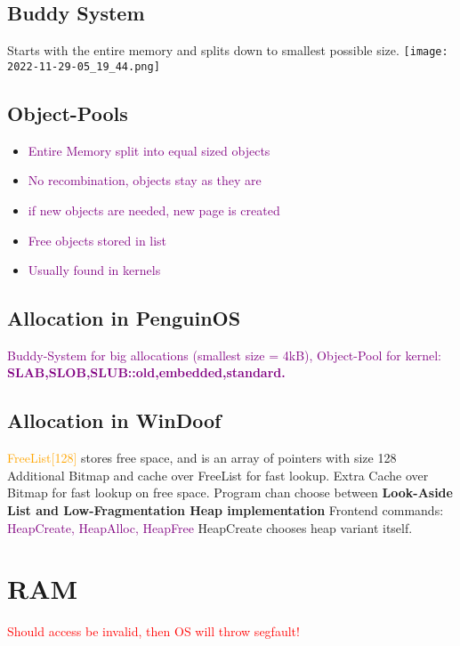 \documentclass[main.tex,fontsize=8pt,paper=a4,paper=landscape,DIV=calc,]{scrartcl}
\begin{document}
\begin{multicols*}{4}
\subsection{Buddy System}
Starts with the entire memory and splits down to smallest possible size.\newline
\texttt{[image: 2022-11-29-05\_19\_44.png]}

\subsection{Object-Pools}
\begin{itemize}
\item \textcolor{purple}{Entire Memory split into equal sized objects}
\item \textcolor{purple}{No recombination, objects stay as they are}
\item \textcolor{purple}{if new objects are needed, new page is created}
\item \textcolor{purple}{Free objects stored in list}
\item \textcolor{purple}{Usually found in kernels}
\end{itemize} 

\subsection{Allocation in PenguinOS}
\textcolor{purple}{Buddy-System for big allocations (smallest size = 4kB), Object-Pool for kernel: \newline 
\textbf{SLAB,SLOB,SLUB::old,embedded,standard.}}

\subsection{Allocation in WinDoof}
\textcolor{orange}{FreeList[128]} stores free space, and is an array of pointers with size 128\newline
Additional Bitmap and cache over FreeList for fast lookup.\newline
Extra Cache over Bitmap for fast lookup on free space.\newline
Program chan choose between \textbf{Look-Aside List and Low-Fragmentation Heap implementation}\newline
Frontend commands: \textcolor{purple}{HeapCreate, HeapAlloc, HeapFree}\newline
HeapCreate chooses heap variant itself.

\section{RAM}
\textcolor{red}{Should access be invalid, then OS will throw segfault!}


\end{multicols*}
\end{document}
